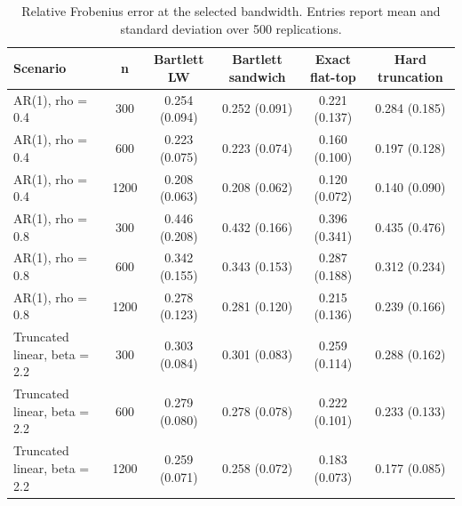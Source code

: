 \begin{table}[!htbp]
\small
\centering
\caption{Relative Frobenius error at the selected bandwidth. Entries report mean and standard deviation over 500 replications.}
\label{tab:relative-frobenius-error}
\begin{tabular}{lccccc}
\toprule
Scenario & n & Bartlett LW & Bartlett sandwich & Exact flat-top & Hard truncation \\
\midrule
AR(1), rho = 0.4 & 300 & 0.254 (0.094) & 0.252 (0.091) & 0.221 (0.137) & 0.284 (0.185) \\
AR(1), rho = 0.4 & 600 & 0.223 (0.075) & 0.223 (0.074) & 0.160 (0.100) & 0.197 (0.128) \\
AR(1), rho = 0.4 & 1200 & 0.208 (0.063) & 0.208 (0.062) & 0.120 (0.072) & 0.140 (0.090) \\
AR(1), rho = 0.8 & 300 & 0.446 (0.208) & 0.432 (0.166) & 0.396 (0.341) & 0.435 (0.476) \\
AR(1), rho = 0.8 & 600 & 0.342 (0.155) & 0.343 (0.153) & 0.287 (0.188) & 0.312 (0.234) \\
AR(1), rho = 0.8 & 1200 & 0.278 (0.123) & 0.281 (0.120) & 0.215 (0.136) & 0.239 (0.166) \\
Truncated linear, beta = 2.2 & 300 & 0.303 (0.084) & 0.301 (0.083) & 0.259 (0.114) & 0.288 (0.162) \\
Truncated linear, beta = 2.2 & 600 & 0.279 (0.080) & 0.278 (0.078) & 0.222 (0.101) & 0.233 (0.133) \\
Truncated linear, beta = 2.2 & 1200 & 0.259 (0.071) & 0.258 (0.072) & 0.183 (0.073) & 0.177 (0.085) \\
\bottomrule
\end{tabular}
\end{table}
